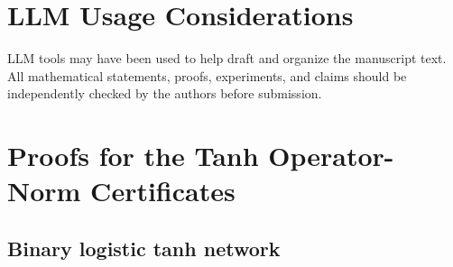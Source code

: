\documentclass[conference,compsoc]{IEEEtran}
\begin{document}
\section{LLM Usage Considerations}

LLM tools may have been used to help draft and organize the manuscript text. All mathematical statements, proofs, experiments, and claims should be independently checked by the authors before submission.

\appendices

\section{Proofs for the Tanh Operator-Norm Certificates}
\label{app:tanh-proofs}

\subsection{Binary logistic tanh network}
\end{document}
